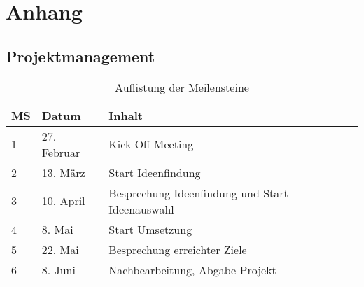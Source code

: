 \section{Anhang}

\subsection{Projektmanagement}


\begin{table}
	\begin{tabular}{l l l}
		\hline
		\textbf{MS} & \textbf{Datum} & \textbf{Inhalt} \\
		\hline
		1	& 27. Februar 	& Kick-Off Meeting \\
		2	& 13. März 		& Start Ideenfindung \\
		3	& 10. April 	& Besprechung Ideenfindung und Start Ideenauswahl \\
		4	& 8.  Mai 		& Start Umsetzung \\
		5	& 22. Mai 		& Besprechung erreichter Ziele \\
		6	& 8.  Juni 		& Nachbearbeitung, Abgabe Projekt \\
		\hline
	\end{tabular}
	\caption{Auflistung der Meilensteine}
	\label{tab:meilensteine}
\end{table}
